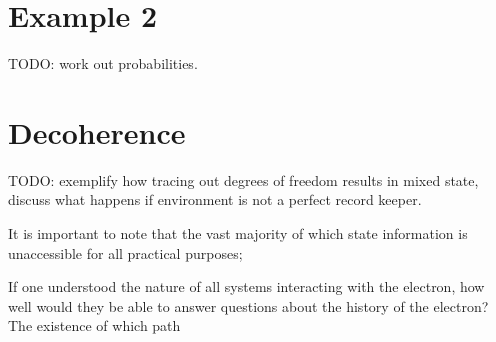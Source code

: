 \section{Example 2}

TODO: work out probabilities.

\section{Decoherence}
TODO: exemplify how tracing out degrees of freedom results in mixed state, discuss what happens if environment is not a perfect record keeper.



 It is important to note that the vast majority of which state information is unaccessible for all practical purposes;

 If one understood the nature of all systems interacting with the electron, how well would they be able to answer questions about the history of the electron? The existence of which path
%
%
%
%
%
%
